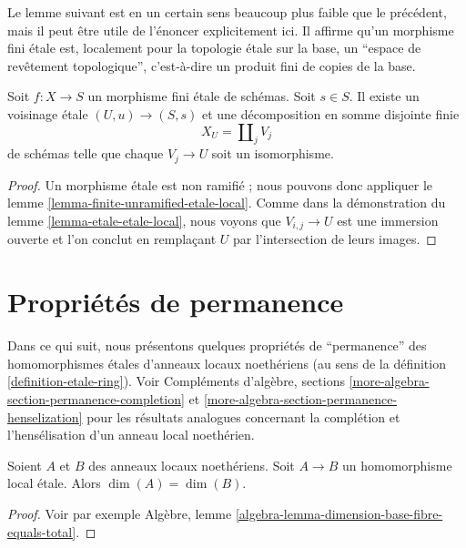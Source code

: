 \noindent
Le lemme suivant est en un certain sens beaucoup plus faible que le précédent,
mais il peut être utile de l'énoncer explicitement ici. Il affirme qu'un morphisme fini
\'etale est, localement pour la topologie \'etale sur la base, un
``espace de revêtement topologique'', c'est-à-dire un produit fini de copies de la base.

\begin{lemma}
\label{lemma-finite-etale-etale-local}
Soit $f : X \to S$ un morphisme fini \'etale de schémas.
Soit $s \in S$. Il existe un voisinage \'etale $(U, u) \to (S, s)$
et une décomposition en somme disjointe finie
$$
X_U = \coprod\nolimits_j V_j
$$
de schémas telle que chaque $V_j \to U$ soit un isomorphisme.
\end{lemma}

\begin{proof}
Un morphisme \'etale est non ramifié ; nous pouvons donc appliquer le
lemme \ref{lemma-finite-unramified-etale-local}.
Comme dans la démonstration du
lemme \ref{lemma-etale-etale-local},
nous voyons que $V_{i, j} \to U$ est une immersion ouverte et l'on conclut
en remplaçant $U$ par l'intersection de leurs images.
\end{proof}




\section{Propriétés de permanence}
\label{section-properties-permanence}

\noindent
Dans ce qui suit, nous présentons quelques propriétés de ``permanence''
des homomorphismes \'etales d'anneaux locaux noethériens
(au sens de la définition \ref{definition-etale-ring}). Voir
Compléments d'algèbre, sections \ref{more-algebra-section-permanence-completion} et
\ref{more-algebra-section-permanence-henselization}
pour les résultats analogues concernant la complétion et
l'hensélisation d'un anneau local noethérien.

\begin{lemma}
\label{lemma-etale-dimension}
Soient $A$ et $B$ des anneaux locaux noethériens.
Soit $A \to B$ un homomorphisme local \'etale.
Alors $\dim(A) = \dim(B)$.
\end{lemma}

\begin{proof}
Voir par exemple
Algèbre, lemme \ref{algebra-lemma-dimension-base-fibre-equals-total}.
\end{proof}

